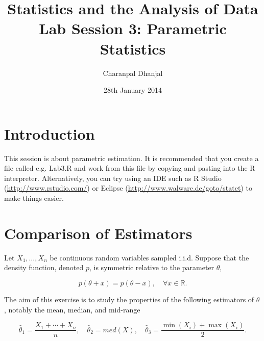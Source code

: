 \documentclass[a4paper,10pt]{article}
\title{Statistics and the Analysis of Data\\ Lab Session 3: Parametric Statistics}
\author{Charanpal Dhanjal}
\begin{document}
\date{28th January 2014}
\maketitle

\section{Introduction} 

This session is about parametric estimation. It is recommended that you create a file called e.g. Lab3.R and work from this file by copying and pasting into the R interpreter. Alternatively, you can try using an IDE such as R Studio (\url{http://www.rstudio.com/}) or Eclipse (\url{http://www.walware.de/goto/statet}) to make things easier. 

\section{Comparison of Estimators} 

Let $X_1, \ldots, X_n$ be continuous random variables sampled i.i.d. Suppose that the density function, denoted $p$, is symmetric relative to the parameter $\theta$, 

\begin{displaymath} 
p(\theta + x) = p(\theta - x), \quad \forall x \in \mathbb{R}. 
\end{displaymath}

The aim of this exercise is to study the properties of the following estimators of $\theta$, notably the mean, median, and mid-range 

\begin{displaymath}
\hat{\theta}_1 = \frac{X_1 + \cdots + X_n}{n}, \quad \hat{\theta}_2 = med(X), \quad \hat{\theta}_3 = \frac{\min(X_i) + \max(X_i)}{2}.
\end{displaymath}
\end{document}
